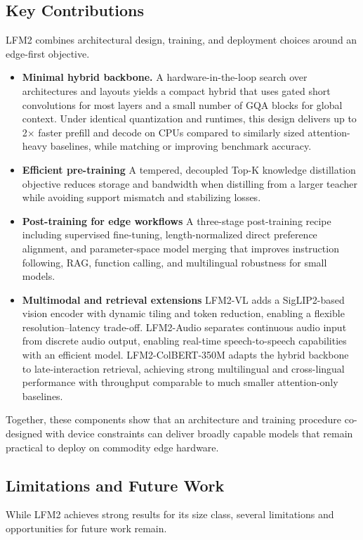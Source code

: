\documentclass{article}
\begin{document}
\subsection{Key Contributions}
LFM2 combines architectural design, training, and deployment choices around an edge-first objective.

\begin{itemize}
  \item \textbf{Minimal hybrid backbone.} A hardware-in-the-loop search over architectures and layouts yields a compact hybrid that uses gated short convolutions for most layers and a small number of GQA blocks for global context. Under identical quantization and runtimes, this design delivers up to 2$\times$ faster prefill and decode on CPUs compared to similarly sized attention-heavy baselines, while matching or improving benchmark accuracy. 
  
  \item \textbf{Efficient pre-training} A tempered, decoupled Top-K knowledge distillation objective reduces storage and bandwidth when distilling from a larger teacher while avoiding support mismatch and stabilizing losses.

  \item \textbf{Post-training for edge workflows} A three-stage post-training recipe including supervised fine-tuning, length-normalized direct preference alignment, and parameter-space model merging that improves instruction following, RAG, function calling, and multilingual robustness for small models.

  \item \textbf{Multimodal and retrieval extensions} LFM2-VL adds a SigLIP2-based vision encoder with dynamic tiling and token reduction, enabling a flexible resolution–latency trade-off. LFM2-Audio separates continuous audio input from discrete audio output, enabling real-time speech-to-speech capabilities with an efficient model. LFM2-ColBERT-350M adapts the hybrid backbone to late-interaction retrieval, achieving strong multilingual and cross-lingual performance with throughput comparable to much smaller attention-only baselines.

\end{itemize}

Together, these components show that an architecture and training procedure co-designed with device constraints can deliver broadly capable models that remain practical to deploy on commodity edge hardware.


\subsection{Limitations and Future Work}
While LFM2 achieves strong results for its size class, several limitations and opportunities for future work remain.
\end{document}
